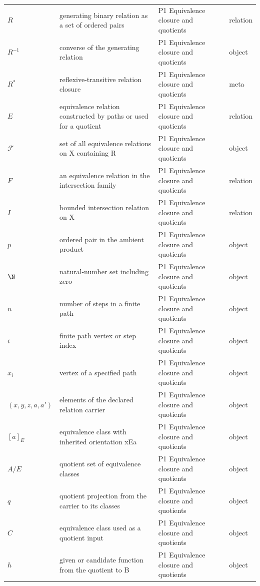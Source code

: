 \begin{longtable}{@{}p{}p{}p{}p{}@{}}
\(R\) & generating binary relation as a set of ordered pairs & P1 Equivalence closure and quotients & relation \\
\(R^{-1}\) & converse of the generating relation & P1 Equivalence closure and quotients & object \\
\(R^*\) & reflexive-transitive relation closure & P1 Equivalence closure and quotients & meta \\
\(E\) & equivalence relation constructed by paths or used for a quotient & P1 Equivalence closure and quotients & relation \\
\(\mathcal F\) & set of all equivalence relations on X containing R & P1 Equivalence closure and quotients & object \\
\(F\) & an equivalence relation in the intersection family & P1 Equivalence closure and quotients & relation \\
\(I\) & bounded intersection relation on X & P1 Equivalence closure and quotients & relation \\
\(p\) & ordered pair in the ambient product & P1 Equivalence closure and quotients & object \\
\(\N\) & natural-number set including zero & P1 Equivalence closure and quotients & object \\
\(n\) & number of steps in a finite path & P1 Equivalence closure and quotients & object \\
\(i\) & finite path vertex or step index & P1 Equivalence closure and quotients & object \\
\(x_i\) & vertex of a specified path & P1 Equivalence closure and quotients & object \\
\((x,\allowbreak y,\allowbreak z,\allowbreak a,\allowbreak a')\) & elements of the declared relation carrier & P1 Equivalence closure and quotients & object \\
\([a]_E\) & equivalence class with inherited orientation xEa & P1 Equivalence closure and quotients & object \\
\(A/E\) & quotient set of equivalence classes & P1 Equivalence closure and quotients & object \\
\(q\) & quotient projection from the carrier to its classes & P1 Equivalence closure and quotients & object \\
\(C\) & equivalence class used as a quotient input & P1 Equivalence closure and quotients & object \\
\(h\) & given or candidate function from the quotient to B & P1 Equivalence closure and quotients & object \\

\end{longtable}

